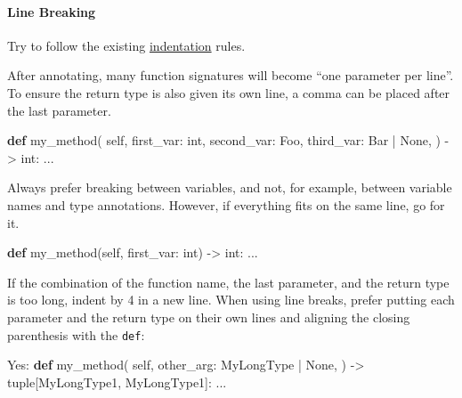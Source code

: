 \documentclass[
]{article}
\newenvironment{Shaded}{}{}
\newcommand{\BuiltInTok}[1]{\textcolor[rgb]{0.00,0.50,0.00}{#1}}
\newcommand{\KeywordTok}[1]{\textcolor[rgb]{0.00,0.44,0.13}{\textbf{#1}}}
\newcommand{\NormalTok}[1]{#1}
\newcommand{\OperatorTok}[1]{\textcolor[rgb]{0.40,0.40,0.40}{#1}}
\newcommand{\VariableTok}[1]{\textcolor[rgb]{0.10,0.09,0.49}{#1}}
\begin{document}
\paragraph{Line Breaking}

Try to follow the existing \hyperref[indentation]{indentation} rules.

After annotating, many function signatures will become ``one parameter
per line''. To ensure the return type is also given its own line, a
comma can be placed after the last parameter.

\begin{samepage}
\begin{Shaded}
\begin{Highlighting}[]
\KeywordTok{def}\NormalTok{ my\_method(}
    \VariableTok{self}\NormalTok{,}
\NormalTok{    first\_var: }\BuiltInTok{int}\NormalTok{,}
\NormalTok{    second\_var: Foo,}
\NormalTok{    third\_var: Bar }\OperatorTok{|} \VariableTok{None}\NormalTok{,}
\NormalTok{) }\OperatorTok{{-}\textgreater{}} \BuiltInTok{int}\NormalTok{:}
\NormalTok{  ...}
\end{Highlighting}
\end{Shaded}
\end{samepage}

Always prefer breaking between variables, and not, for example, between
variable names and type annotations. However, if everything fits on the
same line, go for it.

\begin{samepage}
\begin{Shaded}
\begin{Highlighting}[]
\KeywordTok{def}\NormalTok{ my\_method(}\VariableTok{self}\NormalTok{, first\_var: }\BuiltInTok{int}\NormalTok{) }\OperatorTok{{-}\textgreater{}} \BuiltInTok{int}\NormalTok{:}
\NormalTok{  ...}
\end{Highlighting}
\end{Shaded}
\end{samepage}

If the combination of the function name, the last parameter, and the
return type is too long, indent by 4 in a new line. When using line
breaks, prefer putting each parameter and the return type on their own
lines and aligning the closing parenthesis with the \texttt{def}:

\begin{samepage}
\begin{Shaded}
\begin{Highlighting}[]
\NormalTok{Yes:}
\KeywordTok{def}\NormalTok{ my\_method(}
    \VariableTok{self}\NormalTok{,}
\NormalTok{    other\_arg: MyLongType }\OperatorTok{|} \VariableTok{None}\NormalTok{,}
\NormalTok{) }\OperatorTok{{-}\textgreater{}} \BuiltInTok{tuple}\NormalTok{[MyLongType1, MyLongType1]:}
\NormalTok{  ...}
\end{Highlighting}
\end{Shaded}
\end{samepage}
\end{document}
